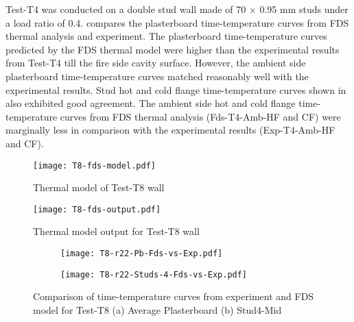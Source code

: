 Test-T4 was conducted on a double stud wall made of 70 $\times$ 0.95 mm studs under a load ratio of 0.4.  compares the plasterboard time-temperature curves from FDS thermal analysis and experiment. The plasterboard time-temperature curves predicted by the FDS thermal model were higher than the experimental results from Test-T4 till the fire side cavity surface. However, the ambient side plasterboard time-temperature curves matched reasonably well with the experimental results. Stud hot and cold flange time-temperature curves shown in  also exhibited good agreement. The ambient side hot and cold flange time-temperature curves from FDS thermal analysis (Fds-T4-Amb-HF and CF) were marginally less in comparison with the experimental results (Exp-T4-Amb-HF and CF).
\begin{figure}[htbp]
	\centering
		\texttt{[image: T8-fds-model.pdf]}
		\caption{Thermal model of Test-T8 wall}
		\label{fig:T8-fds-model}
\end{figure}
\begin{figure}[htbp]
	\centering
		\texttt{[image: T8-fds-output.pdf]}
		\caption{Thermal model output for Test-T8 wall}
		\label{fig:T8-fds-output}
\end{figure}
\begin{figure}[!htbp]
	\centering
	\begin{subfigure}[b]{0.7\textwidth}
		\centering
		\texttt{[image: T8-r22-Pb-Fds-vs-Exp.pdf]}
		\caption{}
		\label{subfig:T8-r22-Pb-Fds-vs-Exp}
	\end{subfigure}
	\begin{subfigure}[b]{0.6\textwidth}
		\centering
		\texttt{[image: T8-r22-Studs-4-Fds-vs-Exp.pdf]}
		\caption{}
		\label{subfig:T8-r22-Studs-4-Fds-vs-Exp}
	\end{subfigure}
	   \caption{Comparison of time-temperature curves from experiment and FDS model for Test-T8 (a) Average Plasterboard (b) Stud4-Mid}
	   \label{fig:fds-output-pb-studs-t8}
\end{figure}

